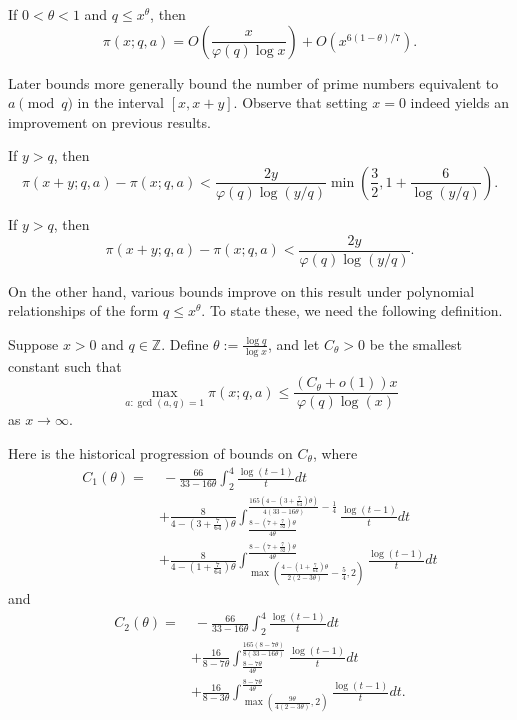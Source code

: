 \begin{theorem}
If $0<\theta<1$ and $q\leq x^\theta$, then
$$\pi(x;q,a)=O\left(\frac x{\varphi(q)\log x}\right)+O(x^{6(1-\theta)/7}).$$
\end{theorem}

Later bounds more generally bound the number of prime numbers equivalent to $a\pmod q$ in the interval $[x,x+y]$. Observe that setting $x=0$ indeed yields an improvement on previous results.

\begin{theorem}
If $y>q$, then
$$\pi(x+y;q,a)-\pi(x;q,a)<\frac{2y}{\varphi(q)\log(y/q)}\min\left(\frac32,1+\frac6{\log(y/q)}\right).$$
\end{theorem}

\begin{theorem}
If $y>q$, then
$$\pi(x+y;q,a)-\pi(x;q,a)<\frac{2y}{\varphi(q)\log(y/q)}.$$
\end{theorem}

On the other hand, various bounds improve on this result under polynomial relationships of the form $q\leq x^\theta$. To state these, we need the following definition.
\begin{definition}
Suppose $x>0$ and $q\in\mathbb Z$. Define $\theta:=\frac{\log q}{\log x}$, and let $C_\theta>0$ be the smallest constant such that
$$\max_{a:\gcd(a,q)=1}\pi(x;q,a)\leq\frac{(C_\theta+o(1))x}{\varphi(q)\log(x)}$$
as $x\to\infty$.
\end{definition}

Here is the historical progression of bounds on $C_\theta$, where
\begin{align}
\nonumber C_1(\theta) =&\ - \frac{66}{33 - 16 \theta} \int_{2}^{4} \frac{\log(t-1)}{t} d t \\
\nonumber & + \frac{8}{4 - \left(3 + \frac{7}{64} \right) \theta} \int_{\frac{8 - \left(7 + \frac{7}{32} \right) \theta }{4 \theta}}^{\frac{165\left(4-\left(3+\frac{7}{64} \right) \theta \right)}{4(33 - 16 \theta)} - \frac{1}{4}} \frac{\log(t-1)}{t} d t \\
\nonumber & + \frac{8}{4 - \left(1 + \frac{7}{64} \right) \theta} \int_{\max \left(\frac{4- \left(1+ \frac{7}{64} \right) \theta}{2 (2-3 \theta )} - \frac{5}{4}, 2 \right)}^{\frac{8 - \left(7 + \frac{7}{32} \right) \theta }{4 \theta}} \frac{\log(t-1)}{t} d t
\end{align}
and
\begin{align}
\nonumber C_2(\theta) =&\ - \frac{66}{33 - 16 \theta} \int_{2}^{4} \frac{\log(t-1)}{t} d t \\
\nonumber & + \frac{16}{8 - 7 \theta} \int_{\frac{8 - 7 \theta}{4 \theta}}^{\frac{165(8-7 \theta)}{8(33 - 16 \theta)} } \frac{\log(t-1)}{t} d t \\
\nonumber & + \frac{16}{8 - 3 \theta} \int_{\max \left(\frac{9 \theta}{4(2 - 3 \theta)}, 2 \right)}^{\frac{8 - 7 \theta}{4 \theta}} \frac{\log(t-1)}{t} d t.
\end{align}

